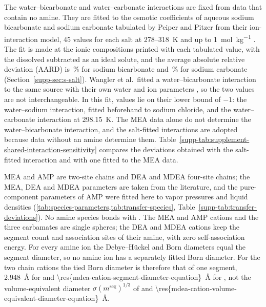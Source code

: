 The water--bicarbonate and water--carbonate interactions are fixed from data that contain no amine.
They are fitted to the osmotic coefficients of aqueous sodium bicarbonate and sodium carbonate tabulated by Peiper and Pitzer from their ion-interaction model, 45 values for each salt at 278--\SI{318}{\kelvin} and up to \SI{1}{\mole\per\kilogram} \cite{peiperThermodynamicsAqueousCarbonate1982}.
The fit is made at the ionic compositions printed with each tabulated value, with the dissolved \COtwo subtracted as an ideal solute, and the average absolute relative deviation (AARD) is \,\% for sodium bicarbonate and \,\% for sodium carbonate (Section~\ref{supp-sec:s-salt}).
Wangler et al.\ fitted a water--bicarbonate interaction to the same source with their own water and ion parameters \cite{Wangler2018}, so the two values are not interchangeable.
In this fit,  values lie on their lower bound of $-1$: the water--sodium interaction, fitted beforehand to sodium chloride, and the water--carbonate interaction at \SI{298.15}{\kelvin}.
The MEA data alone do not determine the water--bicarbonate interaction, and the salt-fitted interactions are adopted because data without an amine determine them.
Table~\ref{supp-tab:supplement-shared-interaction-sensitivity} compares the deviations obtained with the salt-fitted interaction and with one fitted to the MEA data.

MEA and AMP are two-site chains and DEA and MDEA four-site chains; the MEA, DEA and MDEA parameters are taken from the literature, and the  pure-component parameters of AMP were fitted here to vapor pressures and liquid densities (\cref{tab:species-parameters,tab:transfer-species}, Table~\ref{supp-tab:transfer-deviations}).
No amine species bonds with \COtwo.
The MEA and AMP cations and the three carbamates are single spheres; the DEA and MDEA cations keep the segment count and association sites of their amine, with zero self-association energy.
For every amine ion the Debye--H\"uckel and Born diameters equal the segment diameter, so no amine ion has a separately fitted Born diameter.
For the two chain cations the tied Born diameter is therefore that of one segment, \SI{2.948}{\angstrom} for  and \SI{\res{mdea-cation-segment-diameter-equation}}{\angstrom} for , not the volume-equivalent diameter $\sigma(m^{\mathrm{seg}})^{1/3}$ of  and \SI{\res{mdea-cation-volume-equivalent-diameter-equation}}{\angstrom}.

